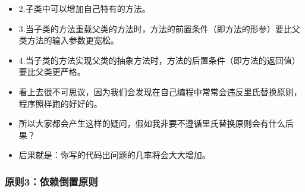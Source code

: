 \documentclass[9pt, b5paper]{article}
\begin{document}
\begin{enumerate}
\begin{itemize}
\item 2.子类中可以增加自己特有的方法。
\item 3.当子类的方法重载父类的方法时，方法的前置条件（即方法的形参）要比父类方法的输入参数更宽松。
\item 4.当子类的方法实现父类的抽象方法时，方法的后置条件（即方法的返回值）要比父类更严格。
\item 看上去很不可思议，因为我们会发现在自己编程中常常会违反里氏替换原则，程序照样跑的好好的。
\item 所以大家都会产生这样的疑问，假如我非要不遵循里氏替换原则会有什么后果？
\item 后果就是：你写的代码出问题的几率将会大大增加。
\end{itemize}
\end{enumerate}
\subsubsection{原则3：依赖倒置原则}
\label{sec:org958bd2b}
\end{document}
